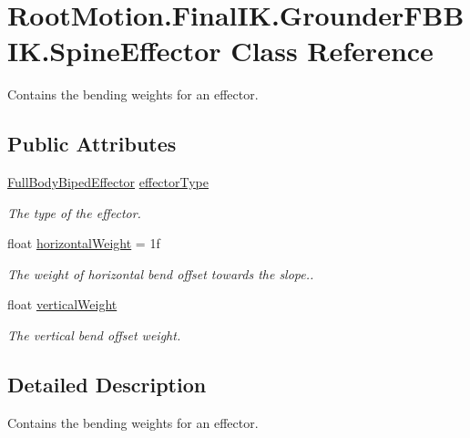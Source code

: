 \hypertarget{class_root_motion_1_1_final_i_k_1_1_grounder_f_b_b_i_k_1_1_spine_effector}{}\section{Root\+Motion.\+Final\+I\+K.\+Grounder\+F\+B\+B\+I\+K.\+Spine\+Effector Class Reference}
\label{class_root_motion_1_1_final_i_k_1_1_grounder_f_b_b_i_k_1_1_spine_effector}


Contains the bending weights for an effector.  


\subsection*{Public Attributes}
\begin{DoxyCompactItemize}
\item 
\mbox{\hyperlink{namespace_root_motion_1_1_final_i_k_ae0dd2058c7667b6f132c11a6b860c14a}{Full\+Body\+Biped\+Effector}} \mbox{\hyperlink{class_root_motion_1_1_final_i_k_1_1_grounder_f_b_b_i_k_1_1_spine_effector_a4d0f36798c9f9c1414ad380f471c26e5}{effector\+Type}}
\begin{DoxyCompactList}\small\item\em The type of the effector. \end{DoxyCompactList}\item 
float \mbox{\hyperlink{class_root_motion_1_1_final_i_k_1_1_grounder_f_b_b_i_k_1_1_spine_effector_a37a91045fefadf6c1a969d7a39316216}{horizontal\+Weight}} = 1f
\begin{DoxyCompactList}\small\item\em The weight of horizontal bend offset towards the slope.. \end{DoxyCompactList}\item 
float \mbox{\hyperlink{class_root_motion_1_1_final_i_k_1_1_grounder_f_b_b_i_k_1_1_spine_effector_a336abbd5c8531f2a6b02d1dd3f6ac63b}{vertical\+Weight}}
\begin{DoxyCompactList}\small\item\em The vertical bend offset weight. \end{DoxyCompactList}\end{DoxyCompactItemize}


\subsection{Detailed Description}
Contains the bending weights for an effector. 



